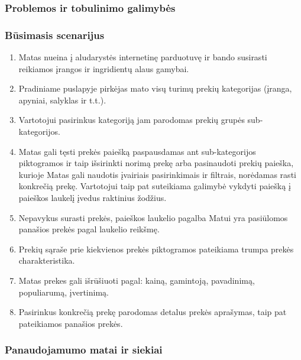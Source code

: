 \documentclass[oneside]{VUMIFPSkursinis}
\begin{document}
		\subsubsection{Problemos ir tobulinimo galimybės}
		\subsubsection{Būsimasis scenarijus}
			\begin{enumerate}
				\item{Matas nueina į aludarystės internetinę parduotuvę ir bando susirasti reikiamos įrangos ir ingridientų alaus gamybai.}
				\item{Pradiniame puslapyje pirkėjas mato visų turimų prekių kategorijas (įranga, apyniai, salyklas ir t.t.).}
				\item{Vartotojui pasirinkus kategoriją jam parodomas prekių grupės sub-kategorijos.}
				\item{Matas gali tęsti prekės paiešką paspausdamas ant sub-kategorijos piktogramos ir taip išsirinkti norimą prekę arba pasinaudoti prekių paieška, kurioje Matas gali naudotis įvairiais  pasirinkimais ir filtrais, norėdamas rasti konkrečią prekę. Vartotojui taip pat suteikiama galimybė vykdyti paiešką į paieškos laukelį įvedus raktinius žodžius.}
				\item{Nepavykus surasti prekės, paieškos laukelio pagalba Matui yra pasiūlomos panašios prekės pagal laukelio reikšmę.}
				\item{Prekių sąraše prie kiekvienos prekės piktogramos pateikiama trumpa prekės charakteristika. }
				\item{Matas prekes gali išrūšiuoti pagal: kainą, gamintoją, pavadinimą, populiarumą, įvertinimą.}
				\item{Pasirinkus konkrečią prekę parodomas detalus prekės aprašymas, taip pat pateikiamos panašios prekės.}
			\end{enumerate}
		\subsubsection{Panaudojamumo matai ir siekiai}
\end{document}
